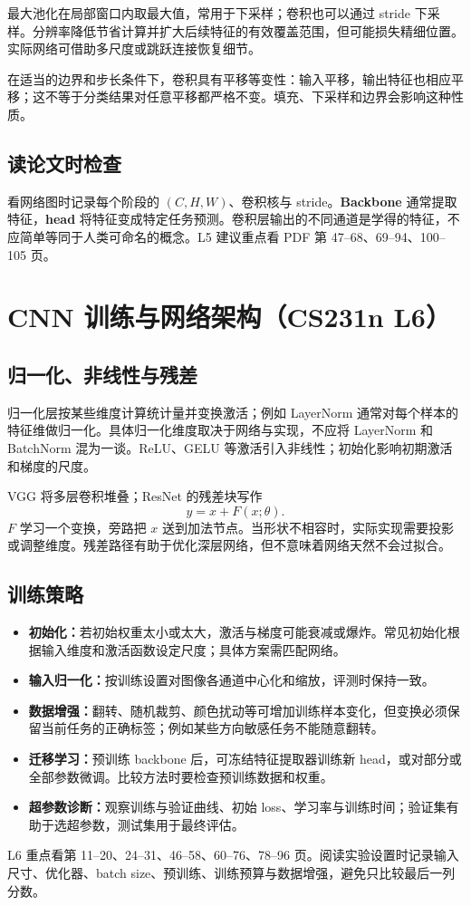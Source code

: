 \documentclass[11pt,a4paper,fontset=none]{ctexart}
\begin{document}
最大池化在局部窗口内取最大值，常用于下采样；卷积也可以通过 stride 下采样。分辨率降低节省计算并扩大后续特征的有效覆盖范围，但可能损失精细位置。实际网络可借助多尺度或跳跃连接恢复细节。

在适当的边界和步长条件下，卷积具有平移等变性：输入平移，输出特征也相应平移；这不等于分类结果对任意平移都严格不变。填充、下采样和边界会影响这种性质。
\subsection{读论文时检查}
看网络图时记录每个阶段的 $(C,H,W)$、卷积核与 stride。\textbf{Backbone} 通常提取特征，\textbf{head} 将特征变成特定任务预测。卷积层输出的不同通道是学得的特征，不应简单等同于人类可命名的概念。L5 建议重点看 PDF 第 47--68、69--94、100--105 页。
\section{CNN 训练与网络架构（CS231n L6）}
\subsection{归一化、非线性与残差}
归一化层按某些维度计算统计量并变换激活；例如 LayerNorm 通常对每个样本的特征维做归一化。具体归一化维度取决于网络与实现，不应将 LayerNorm 和 BatchNorm 混为一谈。ReLU、GELU 等激活引入非线性；初始化影响初期激活和梯度的尺度。

VGG 将多层卷积堆叠；ResNet 的残差块写作
\[
y=x+F(x;\theta).
\]
$F$ 学习一个变换，旁路把 $x$ 送到加法节点。当形状不相容时，实际实现需要投影或调整维度。残差路径有助于优化深层网络，但不意味着网络天然不会过拟合。
\subsection{训练策略}
\begin{itemize}
\item \textbf{初始化：}若初始权重太小或太大，激活与梯度可能衰减或爆炸。常见初始化根据输入维度和激活函数设定尺度；具体方案需匹配网络。
\item \textbf{输入归一化：}按训练设置对图像各通道中心化和缩放，评测时保持一致。
\item \textbf{数据增强：}翻转、随机裁剪、颜色扰动等可增加训练样本变化，但变换必须保留当前任务的正确标签；例如某些方向敏感任务不能随意翻转。
\item \textbf{迁移学习：}预训练 backbone 后，可冻结特征提取器训练新 head，或对部分或全部参数微调。比较方法时要检查预训练数据和权重。
\item \textbf{超参数诊断：}观察训练与验证曲线、初始 loss、学习率与训练时间；验证集有助于选超参数，测试集用于最终评估。
\end{itemize}
L6 重点看第 11--20、24--31、46--58、60--76、78--96 页。阅读实验设置时记录输入尺寸、优化器、batch size、预训练、训练预算与数据增强，避免只比较最后一列分数。
\end{document}
